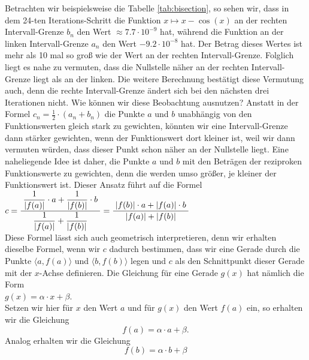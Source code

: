  Betrachten wir beispielsweise die Tabelle \ref{tab:bisection}, so sehen wir, dass
in dem 24-ten Iterations-Schritt die Funktion $x \mapsto x - \cos(x)$ an der rechten
Intervall-Grenze $b_n$ den Wert $\approx 7.7 \cdot 10^{-9}$ hat, w\"ahrend die Funktion an der
linken Intervall-Grenze $a_n$ den Wert $-9.2 \cdot 10^{-8}$ hat.  Der Betrag dieses Wertes ist
mehr als 10 mal so gro{\ss} wie der Wert an der rechten Intervall-Grenze.  Folglich liegt es
nahe zu vermuten, dass die Nullstelle n\"aher an der rechten Intervall-Grenze liegt als an
der linken.  Die weitere Berechnung best\"atigt diese Vermutung auch, denn die rechte
Intervall-Grenze \"andert sich bei den n\"achsten drei Iterationen nicht.  Wie k\"onnen wir
diese Beobachtung ausnutzen?  Anstatt in der Formel $c_n = \frac{1}{2}\cdot(a_n + b_n)$ die
Punkte $a$ und $b$ unabh\"angig von den Funktionswerten gleich stark zu gewichten, k\"onnten
wir eine Intervall-Grenze dann st\"arker gewichten, wenn der Funktionswert dort kleiner ist,
weil wir dann vermuten w\"urden, dass dieser Punkt schon n\"aher an der Nullstelle liegt.
Eine naheliegende Idee ist daher, die Punkte $a$ und $b$ mit den Betr\"agen der reziproken
Funktionswerte zu gewichten, denn die werden umso gr\"o{\ss}er, je kleiner der Funktionswert
ist.  Dieser Ansatz f\"uhrt auf die Formel
\\[0.2cm]
\hspace*{1.3cm} $c = \displaystyle\frac{\;\displaystyle\frac{1}{|f(a)|}\cdot a + \frac{1}{|f(b)|}\cdot b\;}{\;\displaystyle\frac{1}{|f(a)|} +
  \frac{1}{|f(b)|}\;} = \displaystyle\frac{\;\displaystyle|f(b)|\cdot a + |f(a)|\cdot b\;}{\;\displaystyle|f(a)| + |f(b)|\;}$
\\[0.3cm]
Diese Formel l\"asst sich auch geometrisch interpretieren, denn wir erhalten dieselbe Formel, wenn
wir $c$ dadurch bestimmen, dass wir eine Gerade durch die Punkte $\bigl\langle a, f(a)\bigr\rangle$ und $\bigl\langle b, f(b)\bigr\rangle$ legen und
$c$ als den Schnittpunkt dieser Gerade mit der $x$-Achse definieren.  Die Gleichung f\"ur eine
Gerade $g(x)$ hat n\"amlich die Form
\\[0.2cm]
\hspace*{1.3cm} $g(x) = \alpha \cdot x + \beta$.
\\[0.2cm]
Setzen wir hier f\"ur $x$ den Wert $a$ und f\"ur $g(x)$ den Wert $f(a)$ ein, so erhalten wir
die Gleichung
\begin{equation}
  \label{eq:null0}
  f(a) = \alpha \cdot a + \beta.
\end{equation}
Analog erhalten wir die Gleichung
\begin{equation}
  \label{eq:null1}
  f(b) = \alpha \cdot b + \beta
\end{equation}
